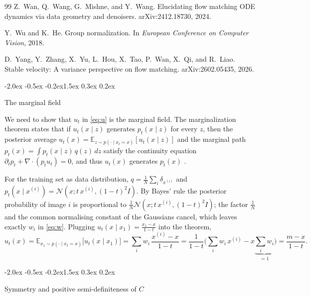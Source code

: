 \documentclass{article}
\makeatletter
\renewcommand{\section}{\@startsection{section}{1}{\z@}%
  {-2.0ex \@plus -0.5ex \@minus -0.2ex}{1.5ex \@plus 0.3ex \@minus 0.2ex}{\large\bfseries\raggedright}}
\theoremstyle{remark}
\newcommand{\E}{\mathbb{E}}
\newcommand{\xn}[1]{x^{(#1)}}
\makeatother
\begin{document}
\begin{thebibliography}{99}
Z.~Wan, Q.~Wang, G.~Mishne, and Y.~Wang.
\newblock Elucidating flow matching ODE dynamics via data geometry and denoisers.
\newblock arXiv:2412.18730, 2024.

Y.~Wu and K.~He.
\newblock Group normalization.
\newblock In \emph{European Conference on Computer Vision}, 2018.

D.~Yang, Y.~Zhang, X.~Yu, L.~Hou, X.~Tao, P.~Wan, X.~Qi, and R.~Liao.
\newblock Stable velocity: A variance perspective on flow matching.
\newblock arXiv:2602.05435, 2026.

\end{thebibliography}

\newpage
\appendix

\section{The marginal field}\label{app:marginal}

We need to show that $u_t$ in \eqref{eq:u} is the marginal field. The marginalization theorem states that if $u_t(x\mid z)$ generates $p_t(x\mid z)$ for every $z$, then the posterior average $u_t(x) = \E_{z \sim p(\cdot \mid x_t = x)}[u_t(x\mid z)]$ and the marginal path $p_t(x) = \int p_t(x\mid z)\,q(z)\,dz$ satisfy the continuity equation $\partial_tp_t + \nabla\!\cdot(p_tu_t) = 0$, and thus $u_t(x)$ generates $p_t(x)$ \citep{lipman2023flow}.

For the training set as data distribution, $q = \frac1N\sum_i\delta_{\xn{i}}$ and $p_t(x\mid\xn{i}) = \mathcal N(x;t\,\xn{i},(1 - t)^2I)$. By Bayes' rule the posterior probability of image $i$ is proportional to $\frac1N\mathcal N(x;t\,\xn{i},(1 - t)^2I)$; the factor $\frac1N$ and the common normalising constant of the Gaussians cancel, which leaves exactly $w_i$ in \eqref{eq:w}. Plugging $u_t(x\mid x_1) = \frac{x_1 - x}{1 - t}$ into the theorem,
\[
  u_t(x) = \E_{x_1 \sim p(\cdot \mid x_t = x)}\big[u_t(x\mid x_1)\big]
  = \sum_iw_i\,\frac{\xn{i} - x}{1 - t}
  = \frac{1}{1 - t}\Big(\sum_iw_i\,\xn{i} - x\underbrace{\sum_iw_i}_{= 1}\Big)
  = \frac{m - x}{1 - t}.
\]

\section{Symmetry and positive semi-definiteness of \texorpdfstring{$C$}{C}}\label{app:psd}
\end{document}
